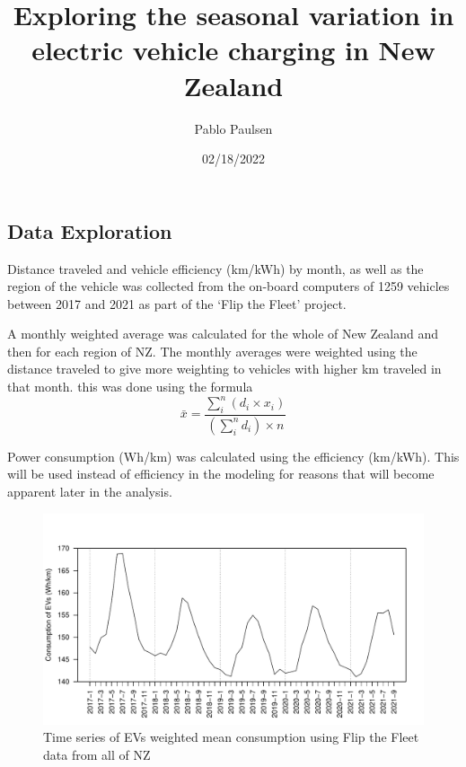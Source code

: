 \documentclass[
]{article}
\title{Exploring the seasonal variation in electric vehicle charging in
New Zealand}
\author{Pablo Paulsen}
\date{02/18/2022}
\begin{document}
\maketitle

\hypertarget{data-exploration}{%
\subsection{Data Exploration}\label{data-exploration}}

Distance traveled and vehicle efficiency (km/kWh) by month, as well as
the region of the vehicle was collected from the on-board computers of
1259 vehicles between 2017 and 2021 as part of the `Flip the Fleet'
project.

A monthly weighted average was calculated for the whole of New Zealand
and then for each region of NZ. The monthly averages were weighted using
the distance traveled to give more weighting to vehicles with higher km
traveled in that month. this was done using the formula
\[\bar{x} = \frac{\sum_{i}^{n} (d_i\times x_i)}{\left(\sum_{i}^{n} d_i\right)\times n}\]

Power consumption (Wh/km) was calculated using the efficiency (km/kWh).
This will be used instead of efficiency in the modeling for reasons that
will become apparent later in the analysis.

\begin{figure}
\centering
\includegraphics{final_report_files/figure-latex/eff_plot-1.pdf}
\caption{Time series of EVs weighted mean consumption using Flip the
Fleet data from all of NZ}
\end{figure}
\end{document}
